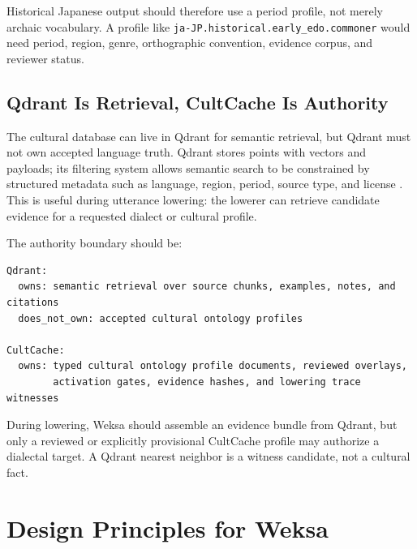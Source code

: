 \documentclass[11pt]{article}
\begin{document}
Historical Japanese output should therefore use a period profile, not merely
archaic vocabulary. A profile like
\texttt{ja-JP.historical.early\_edo.commoner} would need period, region, genre,
orthographic convention, evidence corpus, and reviewer status.

\subsection{Qdrant Is Retrieval, CultCache Is Authority}

The cultural database can live in Qdrant for semantic retrieval, but Qdrant must
not own accepted language truth. Qdrant stores points with vectors and payloads;
its filtering system allows semantic search to be constrained by structured
metadata such as language, region, period, source type, and license
\cite{qdrantFiltering,qdrantPayload}. This is useful during utterance lowering:
the lowerer can retrieve candidate evidence for a requested dialect or cultural
profile.

The authority boundary should be:

\begin{lstlisting}[basicstyle=\ttfamily\small,breaklines=true]
Qdrant:
  owns: semantic retrieval over source chunks, examples, notes, and citations
  does_not_own: accepted cultural ontology profiles

CultCache:
  owns: typed cultural ontology profile documents, reviewed overlays,
        activation gates, evidence hashes, and lowering trace witnesses
\end{lstlisting}

During lowering, Weksa should assemble an evidence bundle from Qdrant, but only
a reviewed or explicitly provisional CultCache profile may authorize a dialectal
target. A Qdrant nearest neighbor is a witness candidate, not a cultural fact.

\section{Design Principles for Weksa}
\end{document}

